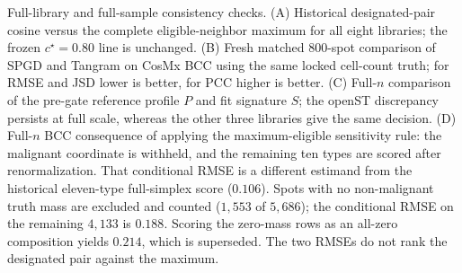 Full-library and full-sample consistency checks. (A) Historical designated-pair cosine versus the complete eligible-neighbor maximum for all eight libraries; the frozen \(c^\star=0.80\) line is unchanged. (B) Fresh matched 800-spot comparison of SPGD and Tangram on CosMx BCC using the same locked cell-count truth; for RMSE and JSD lower is better, for PCC higher is better. (C) Full-\(n\) comparison of the pre-gate reference profile \(P\) and fit signature \(S\); the openST discrepancy persists at full scale, whereas the other three libraries give the same decision. (D) Full-\(n\) BCC consequence of applying the maximum-eligible sensitivity rule: the malignant coordinate is withheld, and the remaining ten types are scored after renormalization. That conditional RMSE is a different estimand from the historical eleven-type full-simplex score (\(0.106\)). Spots with no non-malignant truth mass are excluded and counted (\(1{,}553\) of \(5{,}686\)); the conditional RMSE on the remaining \(4{,}133\) is \(0.188\). Scoring the zero-mass rows as an all-zero composition yields \(0.214\), which is superseded. The two RMSEs do not rank the designated pair against the maximum.

